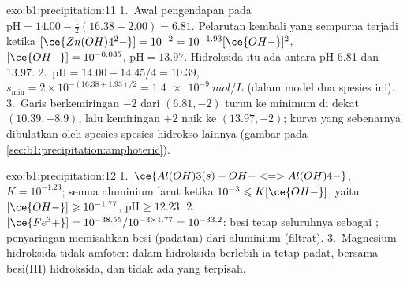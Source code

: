 \begin{solution}{exo:b1:precipitation:11}
1.~Awal pengendapan pada $\mathrm{pH} = 14.00 - \frac12(16.38 - 2.00) = 6.81$.
Pelarutan kembali yang sempurna terjadi ketika
$[\ce{Zn(OH)4^2-}] = 10^{-2} = 10^{-1.93}[\ce{OH-}]^2$,
$[\ce{OH-}] = 10^{-0.035}$, $\mathrm{pH} = 13.97$. Hidroksida itu ada
antara pH 6.81 dan 13.97.
2.~$\mathrm{pH} = 14.00 - 14.45/4 = 10.39$, $s_{\min} = 2 \times
10^{-(16.38 + 1.93)/2} = \qty{1.4e-9}{mol/L}$ (dalam model dua spesies
ini).
3.~Garis berkemiringan $-2$ dari $(6.81, -2)$ turun ke minimum di dekat
$(10.39, -8.9)$, lalu kemiringan $+2$ naik ke $(13.97, -2)$; kurva yang
sebenarnya dibulatkan oleh spesies-spesies hidrokso lainnya
(gambar pada \cref{sec:b1:precipitation:amphoteric}).
\end{solution}

\begin{solution}{exo:b1:precipitation:12}
1.~$\ce{Al(OH)3(s) + OH- <=> Al(OH)4-}$, $K = 10^{-1.23}$; semua aluminium
larut ketika $10^{-3} \leqslant K[\ce{OH-}]$, yaitu
$[\ce{OH-}] \geqslant 10^{-1.77}$, $\mathrm{pH} \geqslant 12.23$.
2.~$[\ce{Fe^3+}] = 10^{-38.55}/10^{-3 \times 1.77} = 10^{-33.2}$: besi
tetap seluruhnya sebagai ; penyaringan memisahkan besi
(padatan) dari aluminium (filtrat).
3.~Magnesium hidroksida tidak amfoter: dalam hidroksida berlebih ia
tetap padat, bersama besi(III) hidroksida, dan tidak ada yang terpisah.
\end{solution}

